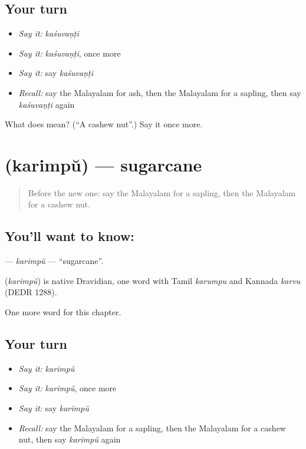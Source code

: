 \subsection*{Your turn}
\begin{itemize}
\raggedright
  \item \emph{Say it:} \emph{kaśuvaṇṭi}
  \item \emph{Say it:} \emph{kaśuvaṇṭi}, once more
  \item \emph{Say it:} say \emph{kaśuvaṇṭi}
  \item \emph{Recall:} say the Malayalam for ash, then the Malayalam for a sapling, then say \emph{kaśuvaṇṭi} again
\end{itemize}

\begin{tcolorbox}[breakable,colback=teal!4,colframe=teal!35!black,title={Before you move on}]
What does  mean? (\textquotedblleft{}A cashew nut\textquotedblright{}.) Say it once more.
\end{tcolorbox}
\section[\texorpdfstring{\ml{കരിമ്പ്} (karimpŭ)}{കരിമ്പ് (karimpŭ)}]{ (karimpŭ) — sugarcane}

\label{lesson:ML-C333-karimpu}



\begin{quote}
Before the new one: say the Malayalam for a sapling, then the Malayalam for a cashew nut.
\end{quote}

\subsection*{You'll want to know: }
\textbf{} — \emph{karimpŭ} — \textquotedblleft{}sugarcane\textquotedblright{}.

\begin{cousinweb}
\textbf{} (\emph{karimpŭ}) is native Dravidian, one word with Tamil \emph{karumpu} and Kannada \emph{karvu} (DEDR 1288).
\end{cousinweb}

\begin{grammarlens}[title={What you've built}]
One more word for this chapter.
\end{grammarlens}

\subsection*{Your turn}
\begin{itemize}
\raggedright
  \item \emph{Say it:} \emph{karimpŭ}
  \item \emph{Say it:} \emph{karimpŭ}, once more
  \item \emph{Say it:} say \emph{karimpŭ}
  \item \emph{Recall:} say the Malayalam for a sapling, then the Malayalam for a cashew nut, then say \emph{karimpŭ} again
\end{itemize}


